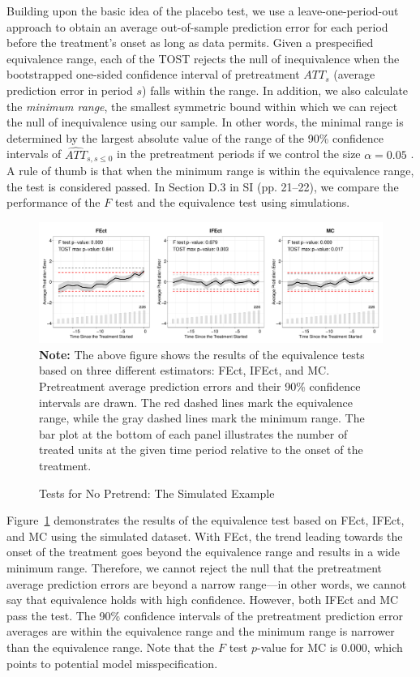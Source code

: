 \documentclass[12pt]{article}
\begin{document}
Building upon the basic idea of the placebo test, we use a leave-one-period-out approach to obtain an average out-of-sample prediction error for each period before the treatment's onset as long as data permits. Given a prespecified equivalence range, each of the TOST rejects the null of inequivalence when the bootstrapped one-sided confidence interval of pretreatment $ATT_s$ (average prediction error in period $s$) falls within the range. In addition, we also calculate the \emph{minimum range}, the smallest symmetric bound within which we can reject the null of inequivalence using our sample. In other words, the minimal range is determined by the largest absolute value of the range of the 90\% confidence intervals of $\widehat{ATT}_{s, s\leq 0}$ in the pretreatment periods if we control the size $\alpha = 0.05$ \citep{hartman2018equivalence}. A rule of thumb is that when the minimum range is within the equivalence range, the test is considered passed. In Section D.3 in SI (pp. 21--22), we compare the performance of the $F$ test and the equivalence test using simulations.%
\begin{figure}[!ht]
\caption{Tests for No Pretrend: The Simulated Example}\label{fg:equivalence}
\centering
\begin{minipage}{0.95\linewidth}{\centering
\includegraphics[width = 1\textwidth]{sim0_equiv.pdf}\\}
\footnotesize\textbf{Note:} The above figure shows the results of the equivalence tests based on three different estimators: FEct, IFEct, and MC. Pretreatment average prediction errors and their 90\% confidence intervals are drawn. The red dashed lines mark the equivalence range, while the gray dashed lines mark the minimum range. The bar plot at the bottom of each panel illustrates the number of treated units at the given time period relative to the onset of the treatment. 
\end{minipage}
\end{figure}
Figure~\ref{fg:equivalence} demonstrates the results of the equivalence test based on FEct, IFEct, and MC using the simulated dataset. With FEct, the trend leading towards the onset of the treatment goes beyond the equivalence range and results in a wide minimum range. Therefore, we cannot reject the null that the pretreatment average prediction errors are beyond a narrow range---in other words, we cannot say that equivalence holds with high confidence. However, both IFEct and MC pass the test. The 90\% confidence intervals of the pretreatment prediction error averages are within the equivalence range and the minimum range is narrower than the equivalence range. Note that the $F$ test $p$-value for MC is $0.000$, which points to potential model misspecification. 
\end{document}
